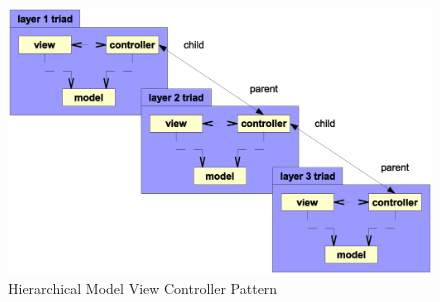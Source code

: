 \begin{figure}[ht]
    \begin{center}
        \includegraphics[scale=0.3]{vector/hmvc.eps}
        \caption{Hierarchical Model View Controller Pattern}
        \label{hmvc_figure}
    \end{center}
\end{figure}
